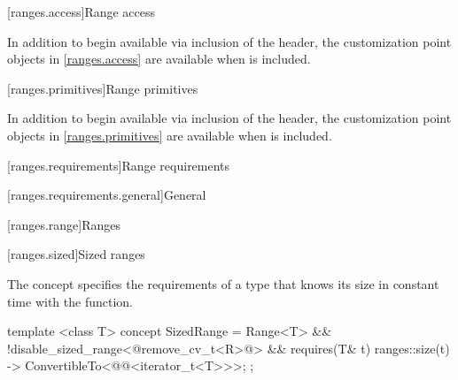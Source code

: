 
[ranges.access]{Range access}

\begin{addedblock}
\pnum
In addition to begin available via inclusion of the  header,
the customization point objects in \ref{ranges.access} are available when
 is included.
\end{addedblock}


[ranges.primitives]{Range primitives}

\begin{addedblock}
\pnum
In addition to begin available via inclusion of the  header,
the customization point objects in \ref{ranges.primitives} are available when
 is included.
\end{addedblock}


[ranges.requirements]{Range requirements}

[ranges.requirements.general]{General}


[ranges.range]{Ranges}


[ranges.sized]{Sized ranges}

\pnum
The  concept specifies the requirements
of a  type that knows its size in constant time with the
 function.

\begin{itemdecl}
template <class T>
concept SizedRange =
  Range<T> &&
  !disable_sized_range<@remove_cv_t<R>\removed{>}@> &&
  requires(T& t) {
    { ranges::size(t) } -> ConvertibleTo<@@<iterator_t<T>>>;
  };
\end{itemdecl}

